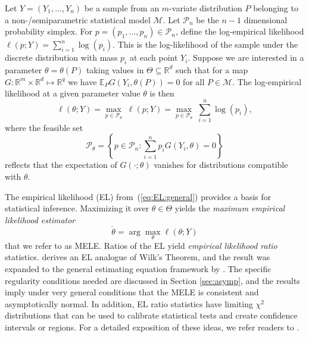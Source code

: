 \documentclass[notitlepage]{article}
\begin{document}
Let $Y=(Y_1,\dots,Y_n)$ be a sample from an $m$-variate distribution
$P$ belonging to a non-/semiparametric statistical model
$\mathcal{M}$.  Let $\mathcal{P}_n$ be the $n-1$ dimensional
probability simplex.  For $p=(p_1,\dots,p_n)\in\mathcal{P}_n$, define
the log-empirical likelihood $\ell(p; Y) = \sum_{i=1}^n \log(p_i)$.
This is the log-likelihood of the sample under the discrete
distribution with mass $p_i$ at each point $Y_i$.  Suppose we are
interested in a parameter $\theta=\theta(P)$ taking values in
$\Theta \subseteq \mathbb{R}^d$ such that for a map
$G: \mathbb{R}^m \times \mathbb{R}^d \mapsto \mathbb{R}^q$ we have
$\mathbb{E}_{P} G(Y_i, \theta(P)) = 0$ for all $P\in\mathcal{M}$.  The
log-empirical likelihood at a given parameter value $\theta$ is then
\begin{equation}
  \label{eq:EL:general}
\ell(\theta; Y) = \max_{p \in \mathcal{P}_\theta } \; \ell(p; Y) =
\max_{p \in \mathcal{P}_\theta } \;\sum_{i=1}^n \log(p_i),
\end{equation}
where the feasible set
\begin{equation}
  \label{eq:general:Ptheta}
\mathcal{P}_\theta = \left\{p\in\mathcal{P}_n: \sum_{i=1}^n  p_i G(Y_i, \theta) = 0 \right\}
\end{equation}
 reflects that the
expectation of $G(\cdot; \theta)$ vanishes for distributions
compatible with $\theta$.

The empirical likelihood (EL) from~(\ref{eq:EL:general}) provides a
basis for statistical inference.  Maximizing it over $\theta\in\Theta$
yields the \emph{maximum empirical likelihood estimator}
\begin{equation}
\check \theta = \arg\max_{\theta} \ell(\theta; Y)
\end{equation}
that we refer to as MELE.  Ratios of the EL yield
\emph{empirical likelihood ratio} statistics.
\citet{owen1988empirical} derives an EL analogue of Wilk's Theorem,
and the result was expanded to the general estimating equation
framework by \citet{qin1994empirical}. The specific regularity
conditions needed are discussed in Section \ref{sec:asymp}, and the
results imply under very general conditions that the MELE is
consistent and asymptotically normal. In addition, EL ratio statistics
have limiting $\chi^2$ distributions that can be used to calibrate
statistical tests and create confidence intervals or regions.  For a
detailed exposition of these ideas, we refer readers to
\cite{owen2001empirical}.
\end{document}
